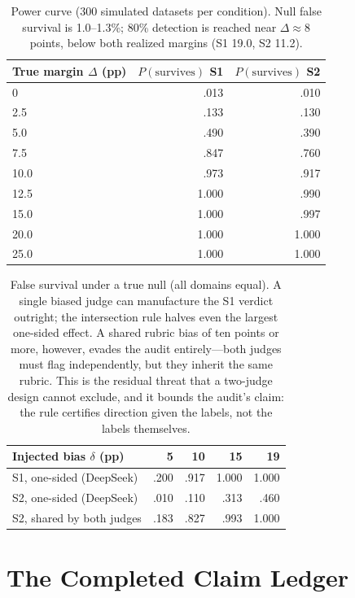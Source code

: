 \documentclass[11pt]{article}
\begin{document}
\begin{table}[H]
\centering
\scriptsize
\setlength{\tabcolsep}{4pt}
\begin{tabular}{@{}lrr@{}}
\toprule
True margin $\Delta$ (pp) & $P(\text{survives})$ S1 & $P(\text{survives})$ S2 \\
\midrule
0 & .013 & .010 \\
2.5 & .133 & .130 \\
5.0 & .490 & .390 \\
7.5 & .847 & .760 \\
10.0 & .973 & .917 \\
12.5 & 1.000 & .990 \\
15.0 & 1.000 & .997 \\
20.0 & 1.000 & 1.000 \\
25.0 & 1.000 & 1.000 \\
\bottomrule
\end{tabular}
\caption{Power curve (300 simulated datasets per condition). Null false survival is 1.0--1.3\%; 80\% detection is reached near $\Delta\approx8$ points, below both realized margins (S1 19.0, S2 11.2).}
\label{tab:powercurve}
\end{table}

\begin{table}[H]
\centering
\scriptsize
\setlength{\tabcolsep}{4.5pt}
\begin{tabular}{@{}lrrrr@{}}
\toprule
Injected bias $\delta$ (pp) & 5 & 10 & 15 & 19 \\
\midrule
S1, one-sided (DeepSeek) & .200 & .917 & 1.000 & 1.000 \\
S2, one-sided (DeepSeek) & .010 & .110 & .313 & .460 \\
S2, shared by both judges & .183 & .827 & .993 & 1.000 \\
\bottomrule
\end{tabular}
\caption{False survival under a true null (all domains equal). A single biased judge can manufacture the S1 verdict outright; the intersection rule halves even the largest one-sided effect. A shared rubric bias of ten points or more, however, evades the audit entirely---both judges must flag independently, but they inherit the same rubric. This is the residual threat that a two-judge design cannot exclude, and it bounds the audit's claim: the rule certifies direction given the labels, not the labels themselves.}
\label{tab:bias}
\end{table}

\clearpage
\onecolumn
\section{The Completed Claim Ledger}
\label{app:ledger}
\end{document}
